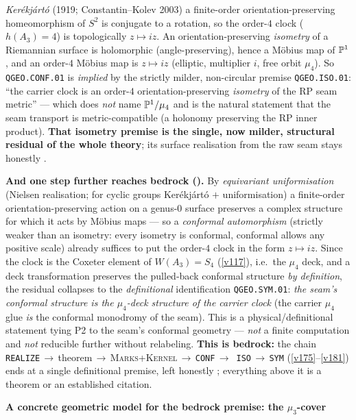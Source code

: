 \begin{keybox}
\emph{Ker\'ekj\'art\'o} (1919; Constantin--Kolev 2003) a finite-order orientation-preserving
homeomorphism of $S^2$ is conjugate to a rotation, so the order-$4$ clock ($h(A_3){=}4$) is
topologically $z\mapsto iz$. An orientation-preserving \emph{isometry} of a Riemannian surface is
holomorphic (angle-preserving), hence a M\"obius map of $\mathbb P^1$, and an order-$4$ M\"obius map is
$z\mapsto iz$ (elliptic, multiplier $i$, free orbit $\mu_4$). So \texttt{QGEO.CONF.01} is \emph{implied}
by the strictly milder, non-circular premise \texttt{QGEO.ISO.01}: ``the carrier clock is an order-$4$
orientation-preserving \emph{isometry} of the RP seam metric'' --- which does \emph{not} name
$\mathbb P^1/\mu_4$ and is the natural statement that the seam transport is metric-compatible (a holonomy
preserving the RP inner product). \textbf{That isometry premise is the single, now milder, structural
residual of the whole theory}; its surface realisation from the raw seam stays honestly \mO.
\par\smallskip\noindent\textbf{And one step further reaches bedrock
().} By \emph{equivariant uniformisation} (Nielsen
realisation; for cyclic groups Ker\'ekj\'art\'o $+$ uniformisation) a finite-order orientation-preserving
action on a genus-$0$ surface preserves a complex structure for which it acts by M\"obius maps --- so a
\emph{conformal automorphism} (strictly weaker than an isometry: every isometry is conformal, conformal
allows any positive scale) already suffices to put the order-$4$ clock in the form $z\mapsto iz$. Since
the clock is the Coxeter element of $W(A_3)=S_4$ (\vref{v117}), i.e.\ the $\mu_4$ deck, and a deck
transformation preserves the pulled-back conformal structure \emph{by definition}, the residual
collapses to the \emph{definitional} identification \texttt{QGEO.SYM.01}: \emph{the seam's conformal
structure is the $\mu_4$-deck structure of the carrier clock} (the carrier $\mu_4$ glue \emph{is} the
conformal monodromy of the seam). This is a physical/definitional statement tying P2 to the seam's
conformal geometry --- \emph{not} a finite computation and \emph{not} reducible further without
relabeling. \textbf{This is bedrock:} the chain
\texttt{REALIZE}\,$\to$\,theorem\,$\to$\,\textsc{Marks{+}Kernel}\,$\to$\,\texttt{CONF}\,$\to$\,%
\texttt{ISO}\,$\to$\,\texttt{SYM} (\vref{v175}--\vref{v181}) ends at a single definitional premise, left
honestly \mO; everything above it is a theorem or an established citation.
\par\smallskip\noindent\textbf{A concrete geometric model for the bedrock premise: the $\mu_3$-cover
}
\end{keybox}
